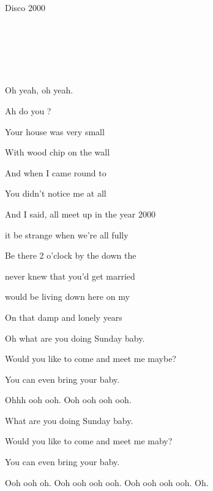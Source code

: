 \begin{song}{Disco 2000}{
	

	\mbox{ \FMaj \FMajsusFour \BMaj \BMajsusFour }	
	

	\mbox{ \FMaj \BFlat }


	\mbox{ \Cm \BFlat \Dm \Gm \FMaj }
	
}
		Oh yeah,
		oh yeah.
	
	 \begin{SongVerse}	     
	                  
		Ah do you ?

		Your house was very small

		With wood chip on the wall
                         
		And when I came round to 

		You didn't notice me at all 		
	 \end{SongVerse}

	\begin{SongVerse}
	
		And I said,  all meet up in the year 2000
                                        
		 it be strange when we're all fully 
                                          
		Be there 2 o'clock by the  down the 

		 never knew that you'd get married 
                             
		 would be living down here on my    

		On that damp and lonely  years  
		
		Oh what are you doing Sunday baby.
		
		Would you like to come and meet me maybe?
		
		You can even bring your baby.
		
		Ohhh ooh ooh. Ooh ooh ooh ooh.
		
		What are you doing Sunday baby.
		
		Would you like to come and meet me maby?
		
		You can even bring your baby.
		
		Ooh ooh oh. Ooh ooh ooh ooh. Ooh ooh ooh ooh. Oh. 
	 \end{SongVerse}

\end{song}